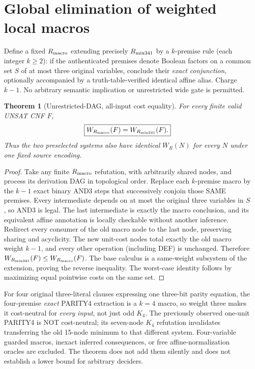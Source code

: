 \documentclass[11pt]{article}
\newtheorem{theorem}{Theorem}
\begin{document}
\section{Global elimination of weighted local macros}
Define a fixed $R_{\rm macro}$ extending precisely $R_{\rm mix341}$ by a $k$-premise rule (each integer $k\ge2$): if the authenticated premises denote Boolean factors on a common set $S$ of at most three original variables, conclude their \emph{exact conjunction}, optionally accompanied by a truth-table-verified identical affine alias. Charge $k-1$. No arbitrary semantic implication or unrestricted wide gate is permitted.
\begin{theorem}[Unrestricted-DAG, all-input cost equality]
For every finite valid UNSAT CNF $F$,
\[
\boxed{W_{R_{\rm macro}}(F)=W_{R_{\rm mix341}}(F).}
\]
Thus the two preselected systems also have identical $\overline W_R(N)$ for every $N$ under one fixed source encoding.
\end{theorem}
\begin{proof}
Take any finite $R_{\rm macro}$ refutation, with arbitrarily shared nodes, and process its derivation DAG in topological order. Replace each $k$-premise macro by the $k-1$ exact binary AND3 steps that successively conjoin those SAME premises. Every intermediate depends on at most the original three variables in $S$, so AND3 is legal. The last intermediate is exactly the macro conclusion, and its equivalent affine annotation is locally checkable without another inference. Redirect every consumer of the old macro node to the last node, preserving sharing and acyclicity. The new unit-cost nodes total exactly the old macro weight $k-1$, and every other operation (including DEF) is unchanged. Therefore $W_{R_{\rm mix341}}(F)\le W_{R_{\rm macro}}(F)$. The base calculus is a same-weight subsystem of the extension, proving the reverse inequality. The worst-case identity follows by maximizing equal pointwise costs on the same set.
\end{proof}
For four original three-literal clauses expressing one three-bit parity equation, the four-premise \emph{exact} PARITY4 extraction is a $k=4$ macro, so weight three makes it cost-neutral for \emph{every input}, not just odd $K_4$. The previously observed one-unit PARITY4 is NOT cost-neutral; its seven-node $K_4$ refutation invalidates transferring the old 15-node minimum to that different system. Four-variable guarded macros, inexact inferred consequences, or free affine-normalization oracles are excluded. The theorem does not add them silently and does not establish a lower bound for arbitrary deciders.
\end{document}
